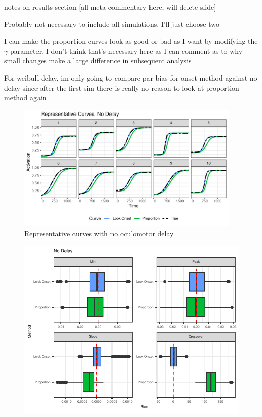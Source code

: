 \documentclass{beamer}
\newcommand{\vp}{\vspace{2mm}}
\begin{document}
\begin{frame}{notes on results section}
[all meta commentary here, will delete slide] \vp

Probably not necessary to include all simulations, I'll just choose two \vp

I can make the proportion curves look as good or bad as I want by modifying  the $\gamma$ parameter. I don't think that's necessary here as I can comment as to why small changes make a large difference in subsequent analysis \vp

For weibull delay, im only going to compare par bias for onset method against no delay since after the first sim there is really no reason to look at proportion method again
\end{frame}


\begin{frame}
\begin{figure}[H]
\centering
\includegraphics[width=0.95\textwidth]{rep_curves_no_delay.pdf}
\caption{Representative curves with no oculomotor delay}
\end{figure}
\end{frame}


\begin{frame}
\begin{figure}[H]
\centering
\includegraphics{no_delay_bar_plot.pdf}
\end{figure}
\end{frame}
\end{document}
